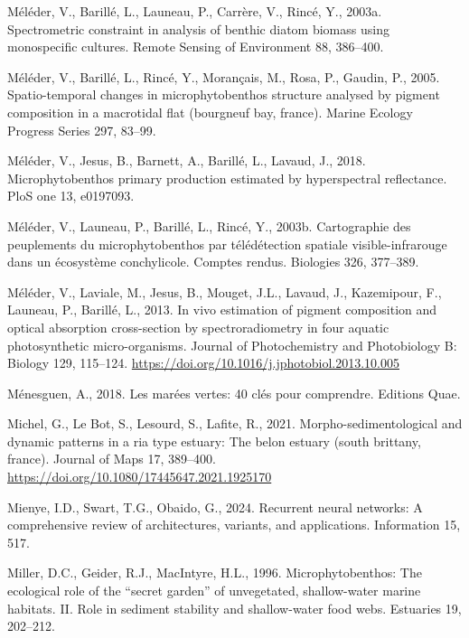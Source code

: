 \documentclass[
  letterpaper,
  11pt,
  english,
  singlespacing,
  headsepline]{MastersDoctoralThesis}
\newlength{\cslhangindent}
\newenvironment{CSLReferences}[2] %
 {\begin{list}{}{%
  \setlength{\itemindent}{0pt}
  \setlength{\leftmargin}{0pt}
  \setlength{\parsep}{0pt}
  \ifodd #1
   \setlength{\leftmargin}{\cslhangindent}
   \setlength{\itemindent}{-1\cslhangindent}
  \fi
  \setlength{\itemsep}{#2\baselineskip}}}
 {\end{list}}
\begin{document}
\begin{CSLReferences}{1}{0}
Méléder, V., Barillé, L., Launeau, P., Carrère, V., Rincé, Y., 2003a.
Spectrometric constraint in analysis of benthic diatom biomass using
monospecific cultures. Remote Sensing of Environment 88, 386--400.

Méléder, V., Barillé, L., Rincé, Y., Morançais, M., Rosa, P., Gaudin,
P., 2005. Spatio-temporal changes in microphytobenthos structure
analysed by pigment composition in a macrotidal flat (bourgneuf bay,
france). Marine Ecology Progress Series 297, 83--99.

Méléder, V., Jesus, B., Barnett, A., Barillé, L., Lavaud, J., 2018.
Microphytobenthos primary production estimated by hyperspectral
reflectance. PloS one 13, e0197093.

Méléder, V., Launeau, P., Barillé, L., Rincé, Y., 2003b. Cartographie
des peuplements du microphytobenthos par t{é}l{é}d{é}tection spatiale
visible-infrarouge dans un {é}cosyst{è}me conchylicole. Comptes rendus.
Biologies 326, 377--389.

Méléder, V., Laviale, M., Jesus, B., Mouget, J.L., Lavaud, J.,
Kazemipour, F., Launeau, P., Barillé, L., 2013. {In vivo estimation of
pigment composition and optical absorption cross-section by
spectroradiometry in four aquatic photosynthetic micro-organisms}.
Journal of Photochemistry and Photobiology B: Biology 129, 115--124.
\url{https://doi.org/10.1016/j.jphotobiol.2013.10.005}

Ménesguen, A., 2018. Les mar{é}es vertes: 40 cl{é}s pour comprendre.
Editions Quae.

Michel, G., Le Bot, S., Lesourd, S., Lafite, R., 2021.
Morpho-sedimentological and dynamic patterns in a ria type estuary: The
belon estuary (south brittany, france). Journal of Maps 17, 389--400.
\url{https://doi.org/10.1080/17445647.2021.1925170}

Mienye, I.D., Swart, T.G., Obaido, G., 2024. Recurrent neural networks:
A comprehensive review of architectures, variants, and applications.
Information 15, 517.

Miller, D.C., Geider, R.J., MacIntyre, H.L., 1996. Microphytobenthos:
The ecological role of the {``secret garden''} of unvegetated,
shallow-water marine habitats. II. Role in sediment stability and
shallow-water food webs. Estuaries 19, 202--212.


\end{CSLReferences}
\end{document}
